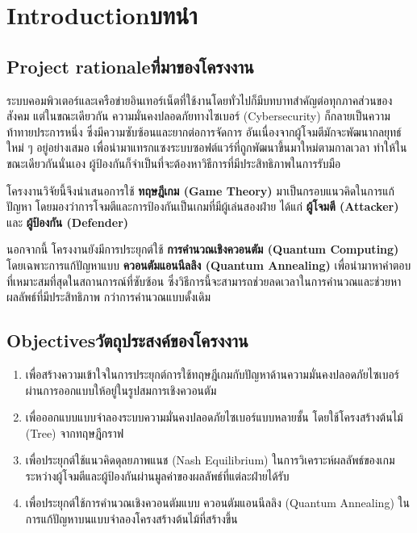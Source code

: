\chapter{\ifenglish Introduction\else บทนำ\fi}

\section{\ifenglish Project rationale\else ที่มาของโครงงาน\fi}
ระบบคอมพิวเตอร์และเครือข่ายอินเทอร์เน็ตที่ใช้งานโดยทั่วไปก็มีบทบาทสำคัญต่อทุกภาคส่วนของสังคม 
แต่ในขณะเดียวกัน ความมั่นคงปลอดภัยทางไซเบอร์ (Cybersecurity) ก็กลายเป็นความท้าทายประการหนึ่ง 
ซึ่งมีความซับซ้อนและยากต่อการจัดการ อันเนื่องจากผู้โจมตีมักจะพัฒนากลยุทธ์ใหม่ ๆ อยู่อย่างเสมอ 
เพื่อนำมาแทรกแซงระบบซอฟต์แวร์ที่ถูกพัฒนาขึ้นมาใหม่ตามกาลเวลา 
ทำให้ในขณะเดียวกันนั่นเอง ผู้ป้องกันก็จำเป็นที่จะต้องหาวิธีการที่มีประสิทธิภาพในการรับมือ  

โครงงานวิจัยนี้จึงนำเสนอการใช้ \textbf{ทฤษฎีเกม (Game Theory)} 
มาเป็นกรอบแนวคิดในการแก้ปัญหา โดยมองว่าการโจมตีและการป้องกันเป็นเกมที่มีผู้เล่นสองฝ่าย ได้แก่ 
\textbf{ผู้โจมตี (Attacker)} และ \textbf{ผู้ป้องกัน (Defender)}  

นอกจากนี้ โครงงานยังมีการประยุกต์ใช้ \textbf{การคำนวณเชิงควอนตัม (Quantum Computing)} 
โดยเฉพาะการแก้ปัญหาแบบ \textbf{ควอนตัมแอนนีลลิง (Quantum Annealing)} 
เพื่อนำมาหาคำตอบที่เหมาะสมที่สุดในสถานการณ์ที่ซับซ้อน 
ซึ่งวิธีการนี้จะสามารถช่วยลดเวลาในการคำนวณและช่วยหาผลลัพธ์ที่มีประสิทธิภาพ 
กว่าการคำนวณแบบดั้งเดิม  
\section{\ifenglish Objectives\else วัตถุประสงค์ของโครงงาน\fi}
\begin{enumerate}
        \item เพื่อสร้างความเข้าใจในการประยุกต์การใช้ทฤษฎีเกมกับปัญหาด้านความมั่นคงปลอดภัยไซเบอร์ ผ่านการออกแบบให้อยู่ในรูปสมการเชิงควอนตัม
        \item เพื่อออกแบบแบบจำลองระบบความมั่นคงปลอดภัยไซเบอร์แบบหลายชั้น โดยใช้โครงสร้างต้นไม้ (Tree) จากทฤษฎีกราฟ
        \item เพื่อประยุกต์ใช้แนวคิดดุลยภาพแนช (Nash Equilibrium) ในการวิเคราะห์ผลลัพธ์ของเกมระหว่างผู้โจมตีและผู้ป้องกันผ่านมูลค่าของผลลัพธ์ที่แต่ละฝ่ายได้รับ
        \item เพื่อประยุกต์ใช้การคำนวณเชิงควอนตัมแบบ ควอนตัมแอนนีลลิง (Quantum Annealing) ในการแก้ปัญหาบนแบบจำลองโครงสร้างต้นไม้ที่สร้างขึ้น
\end{enumerate}

